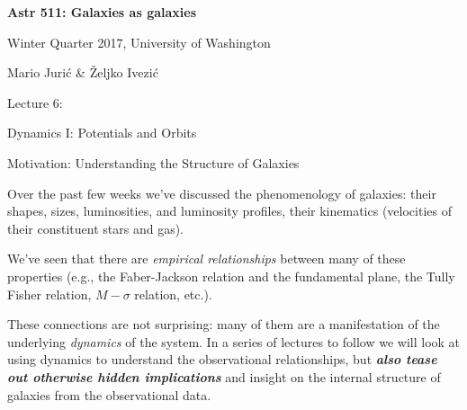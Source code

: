 \documentclass[letterpaper,landscape]{slides}
\begin{document}
\newcommand{\Spicslide}[7]{%
  \begin{slide}
     \begin{center}
        \begin{minipage}{#5in}
            \vskip #6in
            \hskip #7in
            {\scalebox{#4}{\texttt{[image: \#1.\#2]}}}
        \end{minipage}
     \end{center}
     \vfill
  \end{slide}
}
 




\begin{slide}

\phantom{x}
\vskip -2in
\begin{center}
\bfseries
{\large {\color{blue} Astr 511: Galaxies as galaxies}}
\end{center}

{\centerline {{\color{blue} 
Winter Quarter 2017, University of Washington}}}
{\centerline {{\color{blue} 
Mario Juri\'{c} \& \v{Z}eljko Ivezi\'{c} }}}

\vskip 1.6in

{\centerline {\Large {\color{red}      Lecture 6:             }}}
\vskip 0.2in 
{\centerline {\huge {\color{blue} Dynamics I: Potentials and Orbits }}}

\vfill
\end{slide}

\begin{slide}
\begin{center}
{\large \color{red} 
          Motivation: Understanding the Structure of Galaxies }
\end{center}

Over the past few weeks we've discussed the phenomenology of galaxies: their
shapes, sizes, luminosities, and luminosity profiles, their kinematics 
(velocities of their constituent stars and gas).

We've seen that there are {\em empirical relationships} between many of
these properties (e.g., the Faber-Jackson relation and the fundamental plane,
the Tully Fisher relation, $M - \sigma$ relation, etc.).

These connections are not surprising: many of them are a manifestation of
the underlying {\em dynamics} of the system. In a series of lectures to
follow we will look at using dynamics to understand the observational
relationships, but {\em \bf also tease out otherwise hidden implications}
and insight on the internal structure of galaxies from the observational data.

\vfill
\end{slide}
\end{document}
